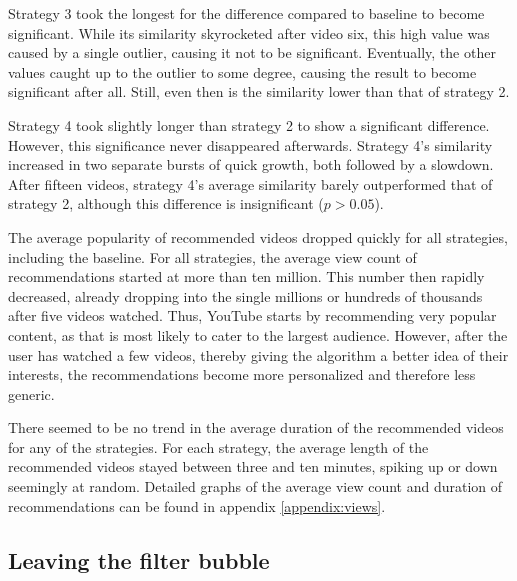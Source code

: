 \documentclass[../main.tex]{subfiles}
\begin{document}
Strategy 3 took the longest for the difference compared to baseline to become significant. While its 
similarity skyrocketed after video six, this high value was caused by a single outlier, causing it not 
to be significant. Eventually, the other values caught up to the outlier to some degree, causing the result 
to become significant after all. Still, even then is the similarity lower than that of strategy 2. 

Strategy 4 took slightly longer than strategy 2 to show a significant difference. However, this significance 
never disappeared afterwards. Strategy 4's similarity increased in two separate bursts of quick growth, 
both followed by a slowdown. After fifteen videos, strategy 4's average similarity barely outperformed 
that of strategy 2, although this difference is insignificant ($p > 0.05$).

The average popularity of recommended videos dropped quickly for all strategies, including the baseline. For 
all strategies, the average view count of recommendations started at more than ten million. This number then 
rapidly decreased, already dropping into the single millions or hundreds of thousands after five videos
watched. Thus, YouTube starts by recommending very popular content, as that is most likely to cater to the 
largest audience. However, after the user has watched a few videos, thereby giving the algorithm a better
idea of their interests, the recommendations become more personalized and therefore less generic. 

There seemed to be no trend in the average duration of the recommended videos for any of the strategies. For 
each strategy, the average length of the recommended videos stayed between three and ten minutes, spiking up 
or down seemingly at random. Detailed graphs of the average view count and duration of recommendations can be
found in appendix \ref{appendix:views}.

\subsection{Leaving the filter bubble}
\end{document}
